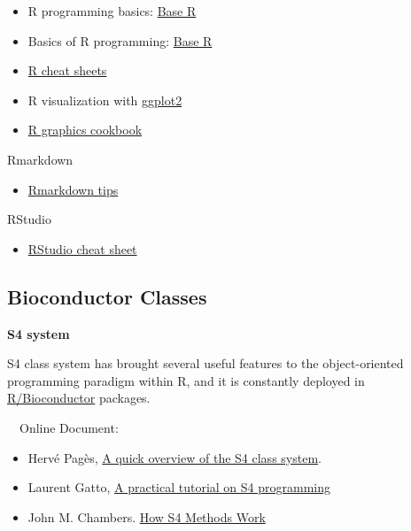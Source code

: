 \documentclass[
]{book}
\providecommand{\tightlist}{%
  \setlength{\itemsep}{0pt}\setlength{\parskip}{0pt}}
\begin{document}
\begin{itemize}
\tightlist
\item
  R programming basics: \href{https://www.rstudio.com/wp-content/uploads/2016/10/r-cheat-sheet-3.pdf}{Base R}
\item
  Basics of R programming: \href{https://raw.githubusercontent.com/rstudio/cheatsheets/master/base-r.pdf}{Base R}
\item
  \href{https://www.rstudio.com/resources/cheatsheets/}{R cheat sheets}
\item
  R visualization with \href{https://www.rstudio.com/wp-content/uploads/2016/11/ggplot2-cheatsheet-2.1.pdf}{ggplot2}
\item
  \href{http://www.cookbook-r.com/Graphs/}{R graphics cookbook}
\end{itemize}

Rmarkdown

\begin{itemize}
\tightlist
\item
  \href{https://rmarkdown.rstudio.com/}{Rmarkdown tips}
\end{itemize}

RStudio

\begin{itemize}
\tightlist
\item
  \href{https://www.rstudio.com/wp-content/uploads/2016/01/rstudio-IDE-cheatsheet.pdf}{RStudio cheat sheet}
\end{itemize}

\hypertarget{bioc_intro}{%
\subsection{Bioconductor Classes}\label{bioc_intro}}

\textbf{S4 system}

S4 class system has brought several useful features to the
object-oriented programming paradigm within R, and it is constantly
deployed in \href{https://bioconductor.org/}{R/Bioconductor} packages.

~~Online Document:

\begin{itemize}
\tightlist
\item
  Hervé Pagès, \href{https://bioconductor.org/packages/release/bioc/vignettes/S4Vectors/inst/doc/S4QuickOverview.pdf}{A quick overview of the S4 class system}.
\item
  Laurent Gatto, \href{https://bioconductor.org/help/course-materials/2013/CSAMA2013/friday/afternoon/S4-tutorial.pdf}{A practical tutorial on S4 programming}
\item
  John M. Chambers. \href{http://developer.r-project.org/howMethodsWork.pdf}{How S4 Methods Work}
\end{itemize}
\end{document}
